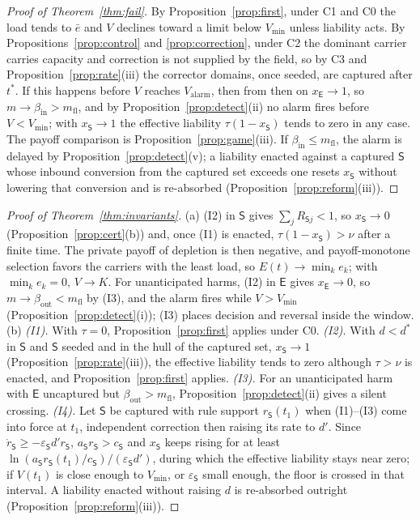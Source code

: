 \documentclass[letterpaper]{article} %
\theoremstyle{definition}
\newcommand{\dE}{\mathsf{E}}
\newcommand{\dS}{\mathsf{S}}
\newcommand{\Valarm}{V_{\mathrm{alarm}}}
\newcommand{\Vmin}{V_{\min}}
\newcommand{\mfl}{m_{\mathrm{fl}}}
\begin{document}
\begin{proof}[Proof of Theorem~\ref{thm:fail}]
By Proposition~\ref{prop:first}, under C1 and C0 the load tends to $\bar e$ and $V$ declines toward a limit below $\Vmin$ unless liability acts. By Propositions~\ref{prop:control} and \ref{prop:correction}, under C2 the dominant carrier carries capacity and correction is not supplied by the field, so by C3 and Proposition~\ref{prop:rate}(iii) the corrector domains, once seeded, are captured after $t^\ast$. If this happens before $V$ reaches $\Valarm$, then from then on $x_\dE\to1$, so $m\to\beta_{\mathrm{in}}>\mfl$, and by Proposition~\ref{prop:detect}(ii) no alarm fires before $V<\Vmin$; with $x_\dS\to1$ the effective liability $\tau(1-x_\dS)$ tends to zero in any case. The payoff comparison is Proposition~\ref{prop:game}(iii). If $\beta_{\mathrm{in}}\le\mfl$, the alarm is delayed by Proposition~\ref{prop:detect}(v); a liability enacted against a captured $\dS$ whose inbound conversion from the captured set exceeds one resets $x_\dS$ without lowering that conversion and is re-absorbed (Proposition~\ref{prop:reform}(iii)).
\end{proof}

\begin{proof}[Proof of Theorem~\ref{thm:invariants}]
(a) (I2) in $\dS$ gives $\sum_jR_{\dS j}<1$, so $x_\dS\to0$ (Proposition~\ref{prop:cert}(b)) and, once (I1) is enacted, $\tau(1-x_\dS)>\nu$ after a finite time. The private payoff of depletion is then negative, and payoff-monotone selection favors the carriers with the least load, so $E(t)\to\min_ke_k$; with $\min_ke_k=0$, $V\to K$. For unanticipated harms, (I2) in $\dE$ gives $x_\dE\to0$, so $m\to\beta_{\mathrm{out}}<\mfl$ by (I3), and the alarm fires while $V>\Vmin$ (Proposition~\ref{prop:detect}(i)); (I3) places decision and reversal inside the window. (b) \emph{(I1).} With $\tau=0$, Proposition~\ref{prop:first} applies under C0. \emph{(I2).} With $d<d^\ast$ in $\dS$ and $\dS$ seeded and in the hull of the captured set, $x_\dS\to1$ (Proposition~\ref{prop:rate}(iii)), the effective liability tends to zero although $\tau>\nu$ is enacted, and Proposition~\ref{prop:first} applies. \emph{(I3).} For an unanticipated harm with $\dE$ uncaptured but $\beta_{\mathrm{out}}>\mfl$, Proposition~\ref{prop:detect}(ii) gives a silent crossing. \emph{(I4).} Let $\dS$ be captured with rule support $r_\dS(t_1)$ when (I1)--(I3) come into force at $t_1$, independent correction then raising its rate to $d'$. Since $\dot r_\dS\ge-\varepsilon_\dS d'r_\dS$, $a_\dS r_\dS>c_\dS$ and $x_\dS$ keeps rising for at least $\ln(a_\dS r_\dS(t_1)/c_\dS)/(\varepsilon_\dS d')$, during which the effective liability stays near zero; if $V(t_1)$ is close enough to $\Vmin$, or $\varepsilon_\dS$ small enough, the floor is crossed in that interval. A liability enacted without raising $d$ is re-absorbed outright (Proposition~\ref{prop:reform}(iii)).
\end{proof}
\end{document}
